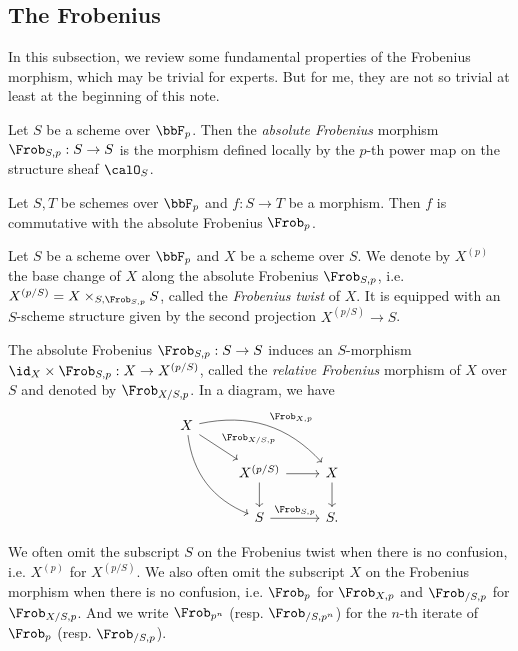 \subsection{The Frobenius}

  In this subsection, we review some fundamental properties of the Frobenius morphism, which may be trivial for experts. 
  But for me, they are not so trivial at least at the beginning of this note.

  \begin{definition}
    Let $S$ be a scheme over $\bbF_p$.
    Then the \emph{absolute Frobenius} morphism $\Frob_{S,p}: S \to S$ is the morphism defined locally by the $p$-th power map on the structure sheaf $\calO_S$.
  \end{definition}

  \begin{proposition}
    Let $S,T$ be schemes over $\bbF_p$ and $f: S \to T$ be a morphism.
    Then $f$ is commutative with the absolute Frobenius $\Frob_p$.
  \end{proposition}

  \begin{definition}
    Let $S$ be a scheme over $\bbF_p$ and $X$ be a scheme over $S$.
    We denote by $X^{(p)}$ the base change of $X$ along the absolute Frobenius $\Frob_{S,p}$, i.e. $X^{(p/S)} = X \times_{S, \Frob_{S,p}} S$, called the \emph{Frobenius twist} of $X$.
    It is equipped with an $S$-scheme structure given by the second projection $X^{(p/S)} \to S$.

    The absolute Frobenius $\Frob_{S,p}: S \to S$ induces an $S$-morphism $\id_X \times \Frob_{S,p}: X \to X^{(p/S)}$, called the \emph{relative Frobenius} morphism of $X$ over $S$ and denoted by $\Frob_{X/S, p}$.
    In a diagram, we have
    \[ \begin{tikzcd}
      X \arrow[rrd, bend left, "\Frob_{X,p}"] \arrow[rdd, bend right] \arrow[rd, "\Frob_{X/S,p}"] & & \\
      & X^{(p/S)} \arrow[r] \arrow[d] & X \arrow[d] \\
      & S \arrow[r, "\Frob_{S,p}"] & S.
    \end{tikzcd} \]
  \end{definition}
  \begin{remark}
    We often omit the subscript $S$ on the Frobenius twist when there is no confusion, i.e. $X^{(p)}$ for $X^{(p/S)}$.
    We also often omit the subscript $X$ on the Frobenius morphism when there is no confusion, i.e. $\Frob_p$ for $\Frob_{X,p}$ and $\Frob_{/S,p}$ for $\Frob_{X/S,p}$.
    And we write $\Frob_{p^n}$ (resp. $\Frob_{/S,p^n}$) for the $n$-th iterate of $\Frob_p$ (resp. $\Frob_{/S,p}$).
  \end{remark}

